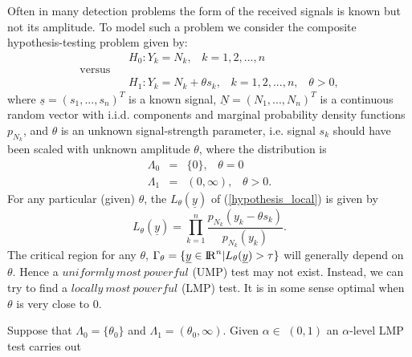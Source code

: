 \documentclass[a4paper,english,12pt]{article}
\begin{document}
\begin{exmp}
Often in many detection problems the form of the received signals is known but not its amplitude. To model such a problem we consider the composite hypothesis-testing problem given by:
\begin{equation}
\begin{split}
\label{hypothesis_local}
&H_{0}: Y_{k} = N_{k}, \hspace{10pt}k=1,2,...,n\\
\text{versus}\hspace{10pt}&
\\&H_{1}: Y_{k} = N_{k}+\theta{s_{k}}, \hspace{10pt}k=1,2,...,n,\hspace{10pt}\theta>0,
\end{split}
\end{equation}
where $\underline{s}=(s_{1},...,s_{n})^T$ is a known signal, $\underline{N}=(N_{1},...,N_{n})^T$ is a continuous random vector with i.i.d. components and marginal probability density functions $p_{N_{k}}$, and $\theta$ is an unknown signal-strength parameter, i.e. signal $s_{k}$ should have been scaled with unknown amplitude $\theta$, where the distribution is
\begin{eqnarray}
\Lambda_{0}&=&\{0\},\hspace{10pt}\theta=0\nonumber\\
\Lambda_{1}&=&(0,\infty),\hspace{10pt}\theta>0.\nonumber
\end{eqnarray}
For any particular (given) $\theta$, the $L_{\theta}(\underline{y})$ of (\ref{hypothesis_local}) is given by
\begin{equation}
\label{L(y)_theta}
L_{\theta}(\underline{y})=\prod_{k=1}^{n}\frac{p_{N_{k}}(y_{k}-\theta s_{k})}{p_{N_{k}}(y_{k})}.
\end{equation}
The critical region for any $\theta$,
$\Gamma_{\theta}=\{\underline{y}\in{\rm I\!R}^n|L_{\theta}(\underline{y})>\tau\}$ will generally depend on $\theta$. Hence a $uniformly\ most\ powerful$ (UMP) test may not exist. Instead, we can try to find a $locally\ most\ powerful$ (LMP) test. It is in some sense optimal when $\theta$ is very close to 0.
\begin{note}
Suppose that $ \Lambda_{0}=\{\theta_{0}\} $ and $ \Lambda_{1}=(\theta_{0},\infty) $. Given $\alpha\in$ $ (0,1) $ an $ \alpha $-level LMP test carries out
\begin{equation}

\end{equation}
\end{note}
\end{exmp}
\end{document}
